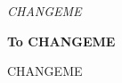 \newpage

\vfill

\vspace*{3cm}

\begin{center}
\emph{CHANGEME}
\newline\newline\newline
\end{center}

\hfil \textbf{To CHANGEME}

\begin{center}
CHANGEME
\end{center}

\vfill

